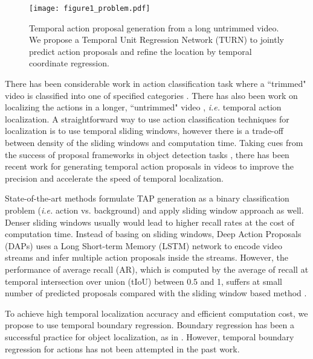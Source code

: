\documentclass[10pt,twocolumn,letterpaper]{article}
\begin{document}
\begin{figure}
\centering
\texttt{[image: figure1\_problem.pdf]}
\caption{ Temporal action proposal generation from a long untrimmed video. We propose a Temporal Unit Regression Network (TURN) to jointly predict action proposals and refine the location by temporal coordinate regression.}
\end{figure}








There has been considerable work in action classification task where a ``trimmed" video is classified into one of specified categories \cite{simonyan2014two, wang2015action}. There has also been work on localizing the actions in a longer, ``untrimmed" video \cite{gan2015devnet, Shou_2016_CVPR, Yuan_2016_CVPR, Yeung_2016_CVPR}, \emph{i.e.} temporal action localization. A straightforward way to use action classification techniques for localization is to use temporal sliding windows, however there is a trade-off between density of the sliding windows and computation time. Taking cues from the success of proposal frameworks in object detection tasks \cite{girshick2015fast, ren2015faster}, there has been recent work for generating temporal action proposals in videos \cite{Shou_2016_CVPR, escorcia2016daps, Heilbron_2016_CVPR} to improve the precision and accelerate the speed of temporal localization.

State-of-the-art methods \cite{Shou_2016_CVPR, Heilbron_2016_CVPR} formulate TAP generation as a binary classification problem (\emph{i.e.} action vs. background) and apply sliding window approach as well. Denser sliding windows usually would lead to higher recall rates at the cost of computation time. Instead of basing on sliding windows, Deep Action Proposals (DAPs) \cite{escorcia2016daps} uses a Long Short-term Memory (LSTM) network to encode video streams and infer multiple action proposals inside the streams. However, the performance of average recall (AR), which is computed by the average of recall at temporal intersection over union (tIoU) between 0.5 and 1, suffers at small number of predicted proposals compared with the sliding window based method \cite{Shou_2016_CVPR} \footnotemark.

To achieve high temporal localization accuracy and efficient computation cost, we propose to use temporal boundary regression. Boundary regression has been a successful practice for object localization, as in \cite{ren2015faster}. However, temporal boundary regression for actions has not been attempted in the past work. 
\end{document}
